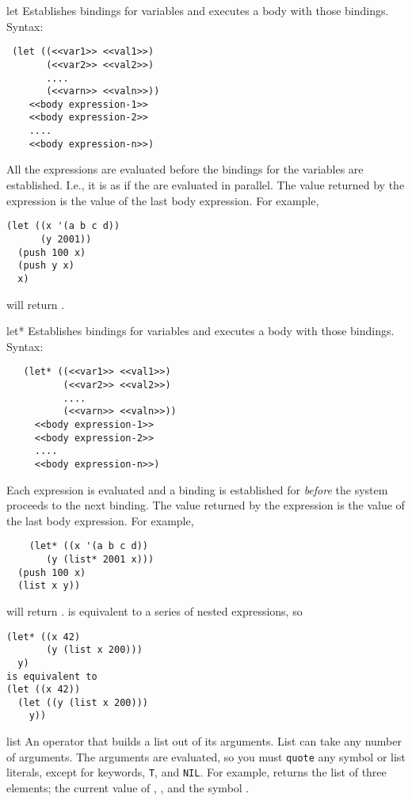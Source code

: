 \begin{okbcfspec}{let}
Establishes bindings for variables and executes a body with
those bindings.\\
Syntax:
\begin{verbatim}
 (let ((<<var1>> <<val1>>)
       (<<var2>> <<val2>>)
       ....
       (<<varn>> <<valn>>))
    <<body expression-1>>
    <<body expression-2>>
    ....
    <<body expression-n>>)
\end{verbatim}
All the  expressions are evaluated before
the bindings for the variables are established. I.e., it is
as if the  are evaluated in parallel.
The value returned by the  expression is the
value of the last body expression.  For example,
\begin{verbatim}
(let ((x '(a b c d))
      (y 2001))
  (push 100 x)
  (push y x)
  x)
\end{verbatim}
will return .
\end{okbcfspec}

\begin{okbcfspec}{let*}
Establishes bindings for variables and executes a body with
those bindings.
Syntax:
\begin{verbatim}
   (let* ((<<var1>> <<val1>>)
          (<<var2>> <<val2>>)
          ....
          (<<varn>> <<valn>>))
     <<body expression-1>>
     <<body expression-2>>
     ....
     <<body expression-n>>)
\end{verbatim}
Each  expression is evaluated and a binding
is established for  {\em before} the system
proceeds to the next binding.  The value returned by the
 expression is the value of the last body
expression.  For example,
\begin{verbatim}
	(let* ((x '(a b c d))
       (y (list* 2001 x)))
  (push 100 x)
  (list x y))
\end{verbatim}
will return .
 is
equivalent to a series of nested  expressions, so
\begin{verbatim}
(let* ((x 42)
       (y (list x 200)))
  y)
is equivalent to
(let ((x 42))
  (let ((y (list x 200)))
    y))
\end{verbatim}
\end{okbcfspec}

\begin{okbcfspec}{list}
An operator that builds a list out of its arguments.  List
can take any number of arguments.  The arguments are
evaluated, so you must {\tt quote} any symbol or list
literals, except for keywords, {\tt T}, and {\tt NIL}.
For example,  returns the list of three
elements; the current value of , , and
the symbol .
\end{okbcfspec}

